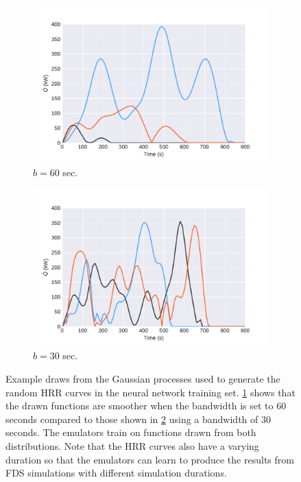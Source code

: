\documentclass{article}
\begin{document}
\begin{figure}[htbp]
  \centering
  \begin{subfigure}[t]{.45\textwidth}
      \centering
      \includegraphics[width=\textwidth,keepaspectratio]{figures/gp_nn_training_smooth.pdf}
      \caption{ $b=60$ sec.}
      \label{fig:gp_nn_training_smooth}
  \end{subfigure}
  \begin{subfigure}[t]{.45\textwidth}
      \centering
      \includegraphics[width=\textwidth ,keepaspectratio]{figures/gp_nn_training_wiggly.pdf}
      \caption{ $b=30$ sec.}
      \label{fig:gp_nn_training_wiggly}
  \end{subfigure}
  \caption{Example draws from the Gaussian processes used to generate the random HRR curves in the neural network training set. \protect\ref{fig:gp_nn_training_smooth} shows that the drawn functions are smoother when the bandwidth is set to 60 seconds compared to those shown in \protect\ref{fig:gp_nn_training_wiggly} using a bandwidth of 30 seconds. The emulators train on functions drawn from both distributions. Note that the HRR curves also have a varying duration so that the emulators can learn to produce the results from FDS simulations with different simulation durations.} 
  \label{fig:gp_nn_training}
\end{figure}
\end{document}
